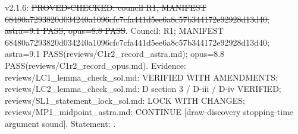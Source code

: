 \begin{theorem}\label{reg:W3-SAMP_D}
\end{theorem}
\begin{statusbox}
 v2.1.6: \st{PROVED-CHECKED; council R1, MANIFEST 68480a7293820d034240a1096cfc7cfa441d5ee6a8c57b344172e92928d13d40, astra=9.1 PASS, opus=8.8 PASS}. Council: R1; MANIFEST 68480a7293820d034240a1096cfc7cfa441d5ee6a8c57b344172e92928d13d40; astra=9.1 PASS(reviews/C1r2\_record\_astra.md); opus=8.8 PASS(reviews/C1r2\_record\_opus.md). Evidence: reviews/LC1\_lemma\_check\_sol.md: VERIFIED WITH AMENDMENTS; reviews/LC2\_lemma\_check\_sol.md: D section 3 / D-iii / D-iv VERIFIED; reviews/SL1\_statement\_lock\_sol.md: LOCK WITH CHANGES; reviews/MP1\_midpoint\_astra.md: CONTINUE [draw-discovery stopping-time argument sound]. Statement: .
\end{statusbox}

